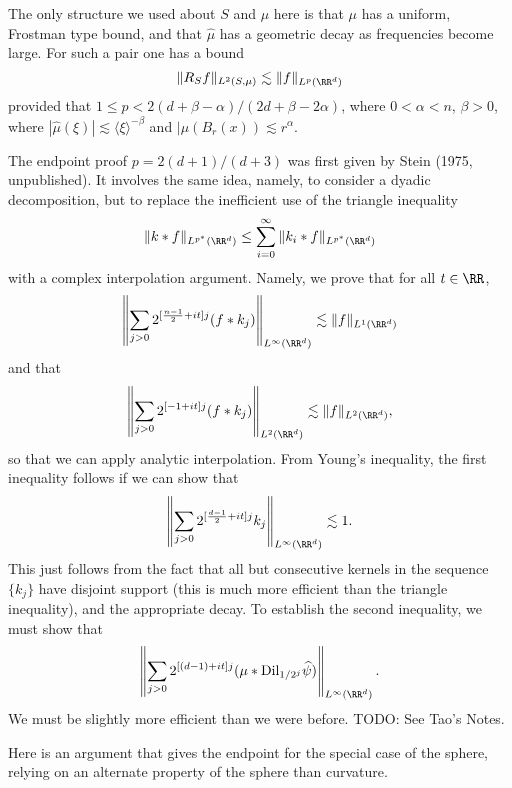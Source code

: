 \begin{remark}
  The only structure we used about $S$ and $\mu$ here is that $\mu$ has a uniform, Frostman type bound, and that $\widehat{\mu}$ has a geometric decay as frequencies become large. For such a pair one has a bound
  \[ \| R_S f \|_{L^2(S,\mu)} \lesssim \| f \|_{L^p(\RR^d)} \]
  provided that $1 \leq p < 2(d + \beta - \alpha)/(2d + \beta - 2\alpha)$, where $0 < \alpha < n$, $\beta > 0$, where $|\widehat{\mu}(\xi)| \lesssim \langle \xi \rangle^{-\beta}$ and $|\mu(B_r(x)) \lesssim r^\alpha$.
\end{remark}

The endpoint proof $p = 2(d+1)/(d+3)$ was first given by Stein (1975, unpublished). It involves the same idea, namely, to consider a dyadic decomposition, but to replace the inefficient use of the triangle inequality
%
\[ \| k * f \|_{L^{p^*}(\RR^d)} \leq \sum_{i = 0}^\infty \| k_i * f \|_{L^{p^*}(\RR^d)} \]
%
with a complex interpolation argument. Namely, we prove that for all $t \in \RR$,
%
\[ \left\| \sum_{j > 0} 2^{[\frac{n-1}{2} + i t] j} (f * k_j) \right\|_{L^\infty(\RR^d)} \lesssim \| f \|_{L^1(\RR^d)} \]
%
and that
%
\[ \left\| \sum_{j > 0} 2^{[-1 + it] j} (f * k_j) \right\|_{L^2(\RR^d)} \lesssim \| f \|_{L^2(\RR^d)}, \]
%
so that we can apply analytic interpolation. From Young's inequality, the first inequality follows if we can show that
%
\[ \left\| \sum_{j > 0} 2^{[\frac{d-1}{2} + it] j} k_j \right\|_{L^\infty(\RR^d)} \lesssim 1. \]
%
This just follows from the fact that all but consecutive kernels in the sequence $\{ k_j \}$ have disjoint support (this is much more efficient than the triangle inequality), and the appropriate decay. To establish the second inequality, we must show that
%
\[ \left\| \sum_{j > 0} 2^{[(d-1) + it] j} (\mu * \text{Dil}_{1/2^j} \widehat{\psi}) \right\|_{L^\infty(\RR^d)}. \]
%
We must be slightly more efficient than we were before. TODO: See Tao's Notes.

Here is an argument that gives the endpoint for the special case of the sphere, relying on an alternate property of the sphere than curvature.

